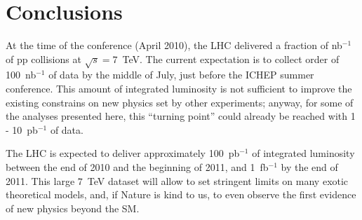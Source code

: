 \documentclass{cmspaper}
\begin{document}
\section{Conclusions}
At the time of the conference (April 2010), the LHC delivered a fraction of nb$^{-1}$ 
of pp collisions at $\sqrt{s} = 7$~TeV. The current expectation 
is to collect order of 100~nb$^{-1}$ of data by the middle of July, just before 
the ICHEP summer conference. This amount of integrated luminosity is not  
sufficient to improve the existing constrains on new physics set by other experiments; 
anyway, for some of the analyses presented here, this ``turning point'' could 
already be reached with 1 - 10~pb$^{-1}$ of data.

The LHC is expected to deliver approximately 100~pb$^{-1}$ of integrated luminosity 
between the end of 2010 and the beginning of 2011, and 1~fb$^{-1}$ by the end of 2011. 
This large $7$~TeV dataset will allow to set stringent limits 
on many exotic theoretical models, and, if Nature is kind to us, 
to even observe the first evidence of new physics beyond the SM.

\end{document}
